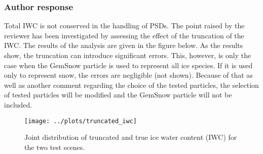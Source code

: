 \documentclass[11pt]{scrartcl}
\begin{document}
\subsubsection*{Author response}
Total IWC is not conserved in the handling of PSDs. The point raised by the reviewer has been
investigated by assessing the effect of the truncation of the IWC. The results of the analysis
are given in the figure below. As the results show, the truncation can introduce significant
errors. This, however, is only the case when the GemSnow particle is used to represent all
ice species. If it is used only to represent snow, the errors are negligible (not shown). Because
of that as well as another comment regarding the choice of the tested particles, the selection of
tested particles will be modified and the GemSnow particle will not be included.

\begin{figure}[!hbpt]
  \centering
  \texttt{[image: ../plots/truncated\_iwc]}
  \caption{Joint distribution of truncated and true ice water content (IWC) for the
    two test scenes.}
\end{figure}
\end{document}
